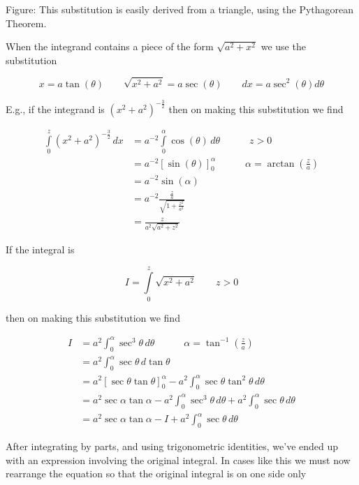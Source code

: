 

Figure: This substitution is easily derived from a triangle, using the Pythagorean Theorem.


When the integrand contains a piece of the form $\sqrt{a^2+x^2}$ we use the substitution


\[
x=a\tan(\theta)\qquad\sqrt{x^2+a^2}=a\sec(\theta)\qquad dx=a\sec^2(\theta)d\theta
\]


E.g., if the integrand is $(x^2+a^2)^{-\frac32}$ then on making this substitution we find


\begin{align}
\int\limits_0^z(x^2+a^2)^{-\frac{3}{2}}\,dx 
&= a^{-2}\int\limits_0^\alpha \cos(\theta)\,d\theta \quad\quad\quad z>0 \\&= a^{-2}\left[\sin(\theta)\right] _0^\alpha \quad\quad\quad \alpha = \arctan\left(\tfrac{z}{a}\right) \\&= a^{-2}\sin(\alpha) \\&= a^{-2}\frac{\frac{z}{a}}{\sqrt{1+\frac{z^2}{a^2}}} \\&= \frac{z}{a^2\sqrt{a^2+z^2}}
\end{align}


If the integral is


\[
I=\int\limits_0^z\sqrt{x^2+a^2}\qquad z>0
\]


then on making this substitution we find


\begin{align}
I &= a^2 \int_0^\alpha \sec^3 \theta \, d\theta \quad\quad\quad \alpha = \tan^{-1} \left(\tfrac{z}{a}\right) \\&= a^2 \int_0^\alpha \sec \theta \, d\tan \theta \\&= a^2 \left[ \sec \theta \tan \theta \right] _0^\alpha - a^2 \int_0^\alpha \sec \theta \tan^2 \theta \, d\theta \\&= a^2 \sec \alpha \tan \alpha - a^2 \int_0^\alpha \sec^3 \theta \, d\theta  + a^2 \int_0^\alpha \sec \theta \, d\theta \\&= a^2 \sec \alpha \tan \alpha - I + a^2 \int_0^\alpha \sec \theta \, d\theta
\end{align}


After integrating by parts, and using trigonometric identities, we've ended up with an expression involving the original integral. In cases like this we must now rearrange the equation so that the original integral is on one side only


